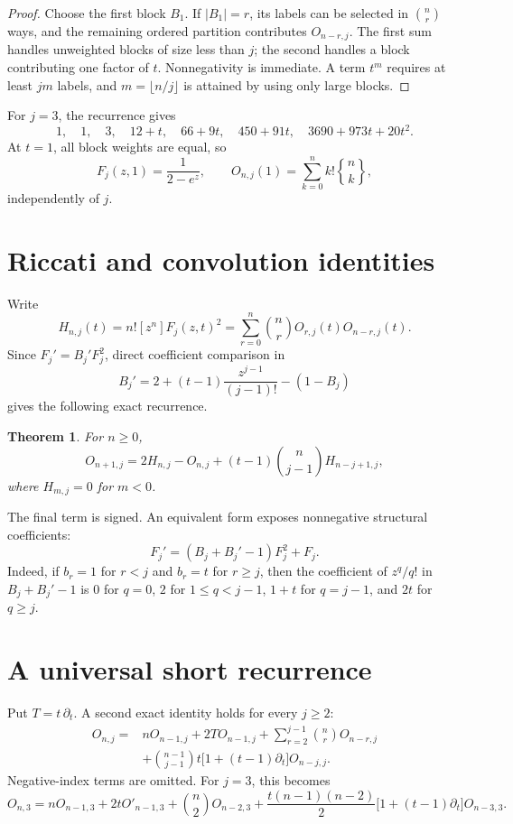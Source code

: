 \documentclass[11pt]{article}
\newtheorem{theorem}{Theorem}[section]
\theoremstyle{definition}
\newcommand{\OO}{O}
\begin{document}
\begin{proof}
Choose the first block \(B_1\).  If \(|B_1|=r\), its labels can be selected in
\(\binom nr\) ways, and the remaining ordered partition contributes
\(\OO_{n-r,j}\).  The first sum handles unweighted blocks of size less than
\(j\); the second handles a block contributing one factor of \(t\).
Nonnegativity is immediate.  A term \(t^m\) requires at least \(jm\) labels,
and \(m=\lfloor n/j\rfloor\) is attained by using only large blocks.
\end{proof}

For \(j=3\), the recurrence gives
\[
1,\quad 1,\quad 3,\quad 12+t,\quad 66+9t,\quad
450+91t,\quad 3690+973t+20t^2.
\]
At \(t=1\), all block weights are equal, so
\[
F_j(z,1)=\frac1{2-e^z},\qquad
\OO_{n,j}(1)=\sum_{k=0}^n k!{n\brace k},
\]
independently of \(j\).

\section{Riccati and convolution identities}

Write
\[
H_{n,j}(t)=n![z^n]F_j(z,t)^2
=\sum_{r=0}^n\binom nr\OO_{r,j}(t)\OO_{n-r,j}(t).
\]
Since \(F_j'=B_j'F_j^2\), direct coefficient comparison in
\[
B_j'=2+(t-1)\frac{z^{j-1}}{(j-1)!}-(1-B_j)
\]
gives the following exact recurrence.

\begin{theorem}
For \(n\ge0\),
\[
\OO_{n+1,j}=2H_{n,j}-\OO_{n,j}
+(t-1)\binom{n}{j-1}H_{n-j+1,j},
\]
where \(H_{m,j}=0\) for \(m<0\).
\end{theorem}

The final term is signed.  An equivalent form exposes nonnegative structural
coefficients:
\[
F_j'=(B_j+B_j'-1)F_j^2+F_j.
\]
Indeed, if \(b_r=1\) for \(r<j\) and \(b_r=t\) for \(r\ge j\), then the
coefficient of \(z^q/q!\) in \(B_j+B_j'-1\) is \(0\) for \(q=0\),
\(2\) for \(1\le q<j-1\), \(1+t\) for \(q=j-1\), and
\(2t\) for \(q\ge j\).

\section{A universal short recurrence}

Put \(T=t\,\partial_t\). A second exact identity holds for every \(j\ge2\):
\[
\begin{aligned}
\OO_{n,j}={}&n\OO_{n-1,j}+2T\OO_{n-1,j}
+\sum_{r=2}^{j-1}\binom nr\OO_{n-r,j}\\
&+\binom{n-1}{j-1}t\bigl[1+(t-1)\partial_t\bigr]\OO_{n-j,j}.
\end{aligned}
\]
Negative-index terms are omitted. For \(j=3\), this becomes
\[
\OO_{n,3}=n\OO_{n-1,3}+2t\OO'_{n-1,3}
+\binom n2\OO_{n-2,3}
+\frac{t(n-1)(n-2)}2
\bigl[1+(t-1)\partial_t\bigr]\OO_{n-3,3}.
\]
\end{document}
